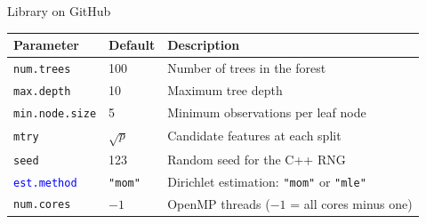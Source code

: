 \begin{frame}{Library on GitHub}
{%
\begin{table}
\small
\begin{tabular}{lp{3cm}p{6cm}}
\toprule
\textbf{Parameter} & \textbf{Default} & \textbf{Description} \\
\midrule
\texttt{num.trees}  & 100          & Number of trees in the forest \\
\texttt{max.depth}  & 10           & Maximum tree depth \\
\texttt{min.node.size} & 5         & Minimum observations per leaf node \\
\texttt{mtry}       & $\sqrt{p}$   & Candidate features at each split \\
\texttt{seed}       & 123          & Random seed for the C++ RNG \\
\texttt{\textcolor{blue}{est.method}} & \texttt{"mom"} & Dirichlet estimation: \texttt{"mom"} or \texttt{"mle"} \\
\texttt{num.cores}  & $-1$         & OpenMP threads ($-1$ = all cores minus one) \\
\bottomrule
\end{tabular}
\end{table}
}
\end{frame}









